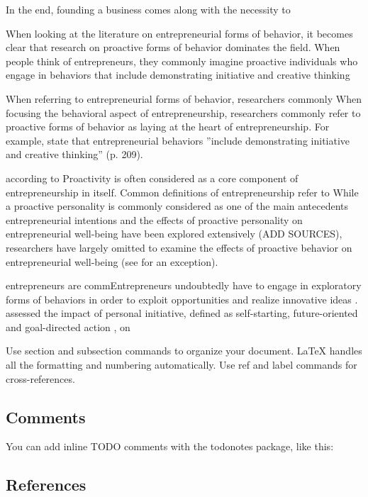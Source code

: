 \documentclass[a4paper,man,natbib]{apa6}
\begin{document}
In the end, founding a business comes along with the necessity to 

When looking at the literature on entrepreneurial forms of behavior, it becomes clear that research on proactive forms of behavior dominates the field. When people think of entrepreneurs, they commonly imagine proactive individuals who engage in behaviors that include demonstrating initiative and creative thinking

 When referring to entrepreneurial forms of behavior, researchers commonly When focusing the behavioral aspect of entrepreneurship, researchers commonly refer to proactive forms of behavior as laying at the heart of entrepreneurship. For example, \cite{Hisrich1990} state that entrepreneurial behaviors ''include demonstrating initiative and creative thinking'' (p. 209). 

according to Proactivity is often considered as a core component of entrepreneurship in itself. Common definitions of entrepreneurship refer to 
While a proactive personality is commonly considered as one of the main antecedents entrepreneurial intentions \cite[e.g.][]{Crant1996} and the effects of proactive personality on entrepreneurial well-being have been explored extensively (ADD SOURCES), researchers have largely omitted to examine the effects of proactive behavior on entrepreneurial well-being (see \cite{Hahn2012} for an exception). 

entrepreneurs are commEntrepreneurs undoubtedly have to engage in exploratory forms of behaviors in order to exploit opportunities and realize innovative ideas \cite[e.g.,][]{Dess1999}. 
\cite{Hahn2012} assessed the impact of personal initiative, defined as self-starting, future-oriented and goal-directed action \citep{Bledow2009}, on 

\cite{Casciaro.2014}  Use section and subsection commands to organize your document. \LaTeX{} handles all the formatting and numbering automatically. Use ref and label commands for cross-references.

\subsection{Comments}

You can add inline TODO comments with the todonotes package, like this:

\subsection{References}
\end{document}
